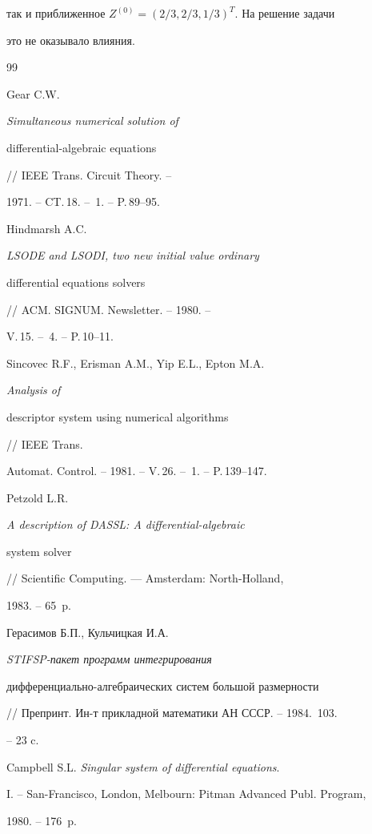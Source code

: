 так и приближенное $Z^{(0)}=(2/3,2/3,1/3)^T$. На решение задачи


это не оказывало влияния.





\begin{thebibliography}{99}







Gear C.W. {\em Simultaneous numerical solution of 


differential-algebraic equations} // IEEE Trans. Circuit Theory. --


1971. -- CT.\,18. -- \No\,1. -- P.\,89--95.




Hindmarsh A.C. {\em LSODE and LSODI, two new initial value ordinary


differential equations solvers} // ACM. SIGNUM. Newsletter. -- 1980. --


V.\,15. -- \No\,4. -- P.\,10--11.




Sincovec R.F., Erisman A.M., Yip E.L., Epton M.A. {\em Analysis of


descriptor system using numerical algorithms} // IEEE Trans.


Automat. Control. -- 1981. -- V.\,26. -- \No\,1. -- P.\,139--147.




Petzold L.R. {\em A description of DASSL: A differential-algebraic


system solver} // Scientific Computing. --- Amsterdam: North-Holland,


1983. -- 65~p.




Герасимов Б.П., Кульчицкая И.А. {\em STIFSP-пакет программ интегрирования


дифференциально-алгебраических систем большой размерности}


// Препринт. Ин-т прикладной математики АН СССР. -- 1984. \No\,103.


-- 23 c.




Campbell S.L. {\em Singular system of differential equations}.


I. -- San-Francisco, London, Melbourn: Pitman Advanced Publ. Program,


1980. -- 176~p.



\end{thebibliography}
